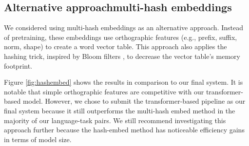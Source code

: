 \documentclass[11pt]{article}
\begin{document}
\subsection{Alternative approach\textemdash multi-hash embeddings}

We considered using multi-hash embeddings \cite{miranda-etal-2022-multi} as an alternative approach.
Instead of pretraining, these embeddings use orthographic features (e.g., prefix, suffix, norm, shape) to create a word vector table.
This approach also applies the hashing trick, inspired by Bloom filters \cite{bloom-1970-space}, to decrease the vector table's memory footprint.

Figure \ref{fig:hashembed} shows the results in comparison to our final system.
It is notable that simple orthographic features are competitive with our transformer-based model.
However, we chose to submit the transformer-based pipeline as our final system because it still outperforms the multi-hash embed method in the majority of our language-task pairs.
We still recommend investigating this approach further because the hash-embed method has noticeable efficiency gains in terms of model size.
\end{document}
